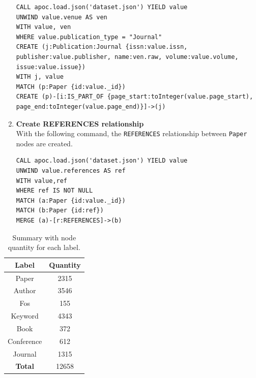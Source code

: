 \begin{enumerate}
\begin{lstlisting}[label={lst:journal}]
CALL apoc.load.json('dataset.json') YIELD value
UNWIND value.venue AS ven
WITH value, ven
WHERE value.publication_type = "Journal"
CREATE (j:Publication:Journal {issn:value.issn, publisher:value.publisher, name:ven.raw, volume:value.volume, issue:value.issue})
WITH j, value
MATCH (p:Paper {id:value._id})
CREATE (p)-[i:IS_PART_OF {page_start:toInteger(value.page_start), page_end:toInteger(value.page_end)}]->(j)
    \end{lstlisting}
    \item \textbf{Create REFERENCES relationship} \\
    With the following command, the \verb|REFERENCES| relationship between \verb|Paper| nodes are created.
    \begin{lstlisting}[label={lst:references}]
CALL apoc.load.json('dataset.json') YIELD value
UNWIND value.references AS ref
WITH value,ref
WHERE ref IS NOT NULL
MATCH (a:Paper {id:value._id})
MATCH (b:Paper {id:ref})
MERGE (a)-[r:REFERENCES]->(b)
    \end{lstlisting}
\end{enumerate}
\begin{table}[H]
    \begin{center}
        \begin{tabular}{| c | c |}
            \hline
            \textbf{Label} & \textbf{Quantity}  \T\B \\
            \hline
            \hline
            Paper          & 2315\T\B              \\
            Author         & 3546\T\B              \\
            Fos            & 155\T\B               \\
            Keyword        & 4343\T\B              \\
            Book           & 372\T\B               \\
            Conference     & 612\T\B               \\
            Journal        & 1315\T\B              \\
            \hline
            \hline
            \textbf{Total} & 12658\T\B             \\
            \hline
        \end{tabular}
        \\[8pt]
        \caption{Summary with node quantity for each label.}
        \label{tab:upload_process}%
    \end{center}
\end{table}


